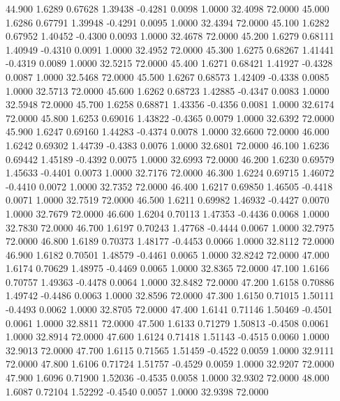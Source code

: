   44.900   1.6289   0.67628   1.39438  -0.4281   0.0098   1.0000  32.4098  72.0000
  45.000   1.6286   0.67791   1.39948  -0.4291   0.0095   1.0000  32.4394  72.0000
  45.100   1.6282   0.67952   1.40452  -0.4300   0.0093   1.0000  32.4678  72.0000
  45.200   1.6279   0.68111   1.40949  -0.4310   0.0091   1.0000  32.4952  72.0000
  45.300   1.6275   0.68267   1.41441  -0.4319   0.0089   1.0000  32.5215  72.0000
  45.400   1.6271   0.68421   1.41927  -0.4328   0.0087   1.0000  32.5468  72.0000
  45.500   1.6267   0.68573   1.42409  -0.4338   0.0085   1.0000  32.5713  72.0000
  45.600   1.6262   0.68723   1.42885  -0.4347   0.0083   1.0000  32.5948  72.0000
  45.700   1.6258   0.68871   1.43356  -0.4356   0.0081   1.0000  32.6174  72.0000
  45.800   1.6253   0.69016   1.43822  -0.4365   0.0079   1.0000  32.6392  72.0000
  45.900   1.6247   0.69160   1.44283  -0.4374   0.0078   1.0000  32.6600  72.0000
  46.000   1.6242   0.69302   1.44739  -0.4383   0.0076   1.0000  32.6801  72.0000
  46.100   1.6236   0.69442   1.45189  -0.4392   0.0075   1.0000  32.6993  72.0000
  46.200   1.6230   0.69579   1.45633  -0.4401   0.0073   1.0000  32.7176  72.0000
  46.300   1.6224   0.69715   1.46072  -0.4410   0.0072   1.0000  32.7352  72.0000
  46.400   1.6217   0.69850   1.46505  -0.4418   0.0071   1.0000  32.7519  72.0000
  46.500   1.6211   0.69982   1.46932  -0.4427   0.0070   1.0000  32.7679  72.0000
  46.600   1.6204   0.70113   1.47353  -0.4436   0.0068   1.0000  32.7830  72.0000
  46.700   1.6197   0.70243   1.47768  -0.4444   0.0067   1.0000  32.7975  72.0000
  46.800   1.6189   0.70373   1.48177  -0.4453   0.0066   1.0000  32.8112  72.0000
  46.900   1.6182   0.70501   1.48579  -0.4461   0.0065   1.0000  32.8242  72.0000
  47.000   1.6174   0.70629   1.48975  -0.4469   0.0065   1.0000  32.8365  72.0000
  47.100   1.6166   0.70757   1.49363  -0.4478   0.0064   1.0000  32.8482  72.0000
  47.200   1.6158   0.70886   1.49742  -0.4486   0.0063   1.0000  32.8596  72.0000
  47.300   1.6150   0.71015   1.50111  -0.4493   0.0062   1.0000  32.8705  72.0000
  47.400   1.6141   0.71146   1.50469  -0.4501   0.0061   1.0000  32.8811  72.0000
  47.500   1.6133   0.71279   1.50813  -0.4508   0.0061   1.0000  32.8914  72.0000
  47.600   1.6124   0.71418   1.51143  -0.4515   0.0060   1.0000  32.9013  72.0000
  47.700   1.6115   0.71565   1.51459  -0.4522   0.0059   1.0000  32.9111  72.0000
  47.800   1.6106   0.71724   1.51757  -0.4529   0.0059   1.0000  32.9207  72.0000
  47.900   1.6096   0.71900   1.52036  -0.4535   0.0058   1.0000  32.9302  72.0000
  48.000   1.6087   0.72104   1.52292  -0.4540   0.0057   1.0000  32.9398  72.0000
